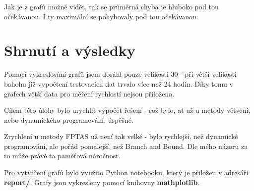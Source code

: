 \documentclass[a4paper,10pt,twocolumn]{article}
\begin{document}
Jak je z grafů možné vidět, tak se průměrná chyba je hluboko pod tou očekávanou. I ty maximální se pohybovaly pod tou očekávanou.


\section{Shrnutí a výsledky}

Pomocí vykreslování grafů jsem dosáhl pouze velikosti 30 - při větší velikosti bahohu již vypočtení testovacích dat trvalo více než 24 hodin. Díky tomu v grafech větší data pro měření rychlostí nejsou přiložena. 

Cílem této úlohy bylo urychlit výpočet řešení - což bylo, ať už u metody větvení, nebo dynamického programování, úspěšné. 

Zrychlení u metody FPTAS už není tak velké - bylo rychlejší, než dynamické programování, ale pořád pomalejší, než Branch and Bound. Dle mého názoru za to může právě ta paměťová náročnost.

Pro vytváření grafů bylo využito Python notebooku, který je přiložen v adresáři \textbf{report/}. Grafy jsou vykresleny pomocí knihovny \textbf{mathplotlib}.





\end{document}
